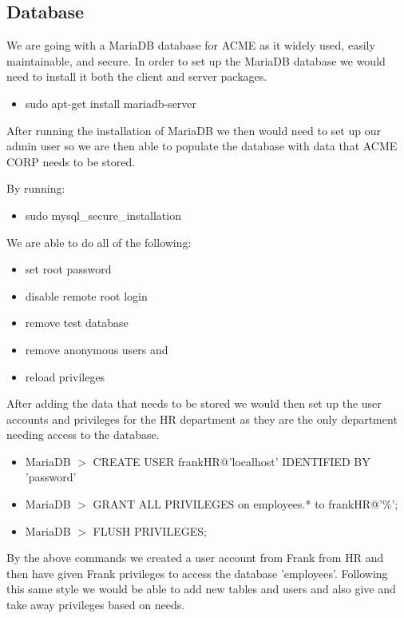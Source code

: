 
\subsection{Database}
We are going with a MariaDB database for ACME as it widely used, easily 
maintainable, and secure. In order to set up the MariaDB database we would
 need to install it both the client and server packages.

\begin{itemize}

\item sudo apt-get install mariadb-server

\end{itemize}

\noindent After running the installation of MariaDB we then would need to set 
up our admin user so we are then able to populate the database with data that 
ACME CORP needs to be stored. 

\noindent By running:

\begin{itemize}
\item sudo mysql\_secure\_installation \\
\end{itemize}

\noindent We are able to do all of the following: 

\begin{itemize}
\item set root password
\item disable remote root login
\item remove test database
\item remove anonymous users and
\item reload privileges
\end{itemize}

\noindent After adding the data that needs to be stored we would then set up 
the user accounts and privileges for the HR department as they are the only 
department needing access to the database.

\begin{itemize}

\item MariaDB $>$ CREATE USER frankHR@'localhost' IDENTIFIED BY 'password'

\item MariaDB $>$ GRANT ALL PRIVILEGES on employees.* to frankHR@'\%';

\item MariaDB $>$ FLUSH PRIVILEGES; 

\end{itemize}

\noindent By the above commands we created a user account from Frank from HR 
and then have given Frank privileges to access the database 'employees'. 
Following this same style we would be able to add new tables and users and also
 give and take away privileges based on needs.


